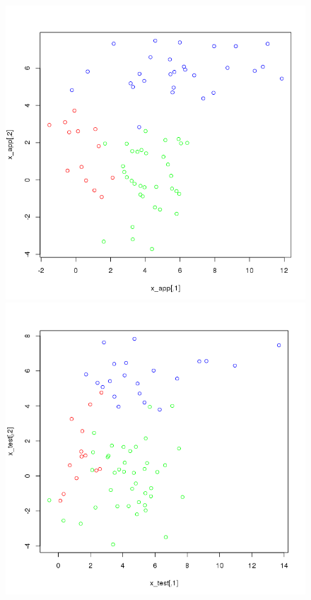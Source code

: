 \documentclass[a4paper,12pt]{report}
\begin{document}
\begin{figure}[!ht]
	\center
	\includegraphics[scale=0.3]{image/q1_1_app.png}
	\includegraphics[scale=0.3]{image/q1_1_test.png}
\end{figure}
\end{document}
